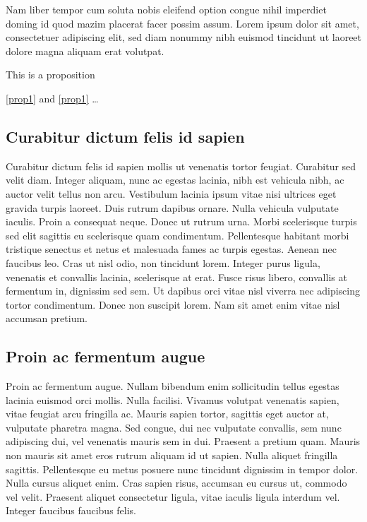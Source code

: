 \documentclass[a4paper,UKenglish,cleveref, autoref]{lipics-v2019}
\begin{document}
\begin{corollary}
\label{lemma:curabitur}
Nam liber tempor cum soluta nobis eleifend option congue nihil imperdiet doming id quod mazim placerat facer possim assum. Lorem ipsum dolor sit amet, consectetuer adipiscing elit, sed diam nonummy nibh euismod tincidunt ut laoreet dolore magna aliquam erat volutpat.
\end{corollary}

\begin{proposition}\label{prop1}
This is a proposition
\end{proposition}

\autoref{prop1} and \cref{prop1} \ldots

\subsection{Curabitur dictum felis id sapien}

Curabitur dictum  felis id sapien mollis ut venenatis tortor feugiat. Curabitur sed velit diam. Integer aliquam, nunc ac egestas lacinia, nibh est vehicula nibh, ac auctor velit tellus non arcu. Vestibulum lacinia ipsum vitae nisi ultrices eget gravida turpis laoreet. Duis rutrum dapibus ornare. Nulla vehicula vulputate iaculis. Proin a consequat neque. Donec ut rutrum urna. Morbi scelerisque turpis sed elit sagittis eu scelerisque quam condimentum. Pellentesque habitant morbi tristique senectus et netus et malesuada fames ac turpis egestas. Aenean nec faucibus leo. Cras ut nisl odio, non tincidunt lorem. Integer purus ligula, venenatis et convallis lacinia, scelerisque at erat. Fusce risus libero, convallis at fermentum in, dignissim sed sem. Ut dapibus orci vitae nisl viverra nec adipiscing tortor condimentum. Donec non suscipit lorem. Nam sit amet enim vitae nisl accumsan pretium. 



\subsection{Proin ac fermentum augue}

Proin ac fermentum augue. Nullam bibendum enim sollicitudin tellus egestas lacinia euismod orci mollis. Nulla facilisi. Vivamus volutpat venenatis sapien, vitae feugiat arcu fringilla ac. Mauris sapien tortor, sagittis eget auctor at, vulputate pharetra magna. Sed congue, dui nec vulputate convallis, sem nunc adipiscing dui, vel venenatis mauris sem in dui. Praesent a pretium quam. Mauris non mauris sit amet eros rutrum aliquam id ut sapien. Nulla aliquet fringilla sagittis. Pellentesque eu metus posuere nunc tincidunt dignissim in tempor dolor. Nulla cursus aliquet enim. Cras sapien risus, accumsan eu cursus ut, commodo vel velit. Praesent aliquet consectetur ligula, vitae iaculis ligula interdum vel. Integer faucibus faucibus felis. 
\end{document}
